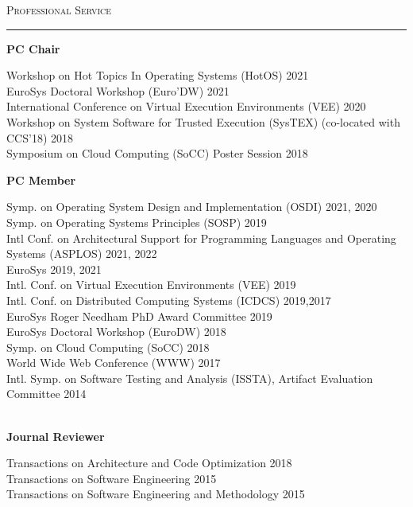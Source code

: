 \documentclass[10pt]{article}
\newcommand{\mysec}[1]{\vspace{2em}\textsc{\large #1}\vspace{1mm}\hrule\vspace{2mm}}
\newcommand{\mysub}[3]{\textbf{#1} {#2} \hfill {\em #3}}
\newcommand{\myssub}[1]{\hspace*{2mm}\parbox{163mm}{#1}\vspace*{2mm}}
\begin{document}
\mysec{Professional Service}


\mysub{PC Chair}{}{}\\
\myssub{\vspace{2mm}
  Workshop on Hot Topics In Operating Systems (HotOS) \hfill 2021 \\
  EuroSys Doctoral Workshop (Euro'DW) \hfill 2021 \\
  International Conference on Virtual Execution Environments (VEE) \hfill 2020 \\
  Workshop on System Software for Trusted Execution (SysTEX) (co-located with CCS'18) \hfill 2018 \\
  Symposium on Cloud Computing (SoCC) Poster Session \hfill 2018 \\
}
%
\mysub{PC Member}{}{}\\
\myssub{\vspace{2mm}
  Symp. on Operating System Design and Implementation (OSDI) \hfill 2021, 2020 \\
  Symp. on Operating Systems Principles (SOSP) \hfill 2019 \\
  Intl Conf. on Architectural Support for Programming Languages and Operating Systems (ASPLOS) \hfill 2021, 2022 \\
  EuroSys \hfill 2019, 2021 \\
  Intl. Conf. on Virtual Execution Environments (VEE) \hfill 2019 \\
  Intl. Conf. on Distributed Computing Systems (ICDCS) \hfill 2019,2017 \\
  EuroSys Roger Needham PhD Award Committee \hfill 2019 \\  
  EuroSys Doctoral Workshop (EuroDW) \hfill 2018 \\
  Symp. on Cloud Computing (SoCC) \hfill 2018 \\
  World Wide Web Conference (WWW) \hfill 2017 \\
  Intl. Symp. on Software Testing and Analysis (ISSTA), Artifact Evaluation Committee \hfill 2014 \\
}\\

\mysub{Journal Reviewer}{}{} \\
\myssub{\vspace{2mm}Transactions on Architecture and Code Optimization \hfill 2018\\
  Transactions on Software Engineering \hfill 2015 \\
  Transactions on Software Engineering and Methodology \hfill 2015} \\
\end{document}
